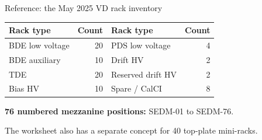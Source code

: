 \begin{frame}{Reference: the May 2025 VD rack inventory}
  \renewcommand{\arraystretch}{1.15}
  \begin{tabularx}{\textwidth}{@{}>{\RaggedRight\arraybackslash}Xr>{\RaggedRight\arraybackslash}Xr@{}}
    \toprule
    \textbf{Rack type} & \textbf{Count} & \textbf{Rack type} & \textbf{Count}\\
    \midrule
    BDE low voltage & 20 & PDS low voltage & 4\\
    BDE auxiliary & 10 & Drift HV & 2\\
    TDE & 20 & Reserved drift HV & 2\\
    Bias HV & 10 & Spare / CalCI & 8\\
    \bottomrule
  \end{tabularx}\par
  \bigskip
  \textbf{76 numbered mezzanine positions:} SEDM-01 to SEDM-76.\par
  \medskip
  The worksheet also has a separate concept for 40 top-plate mini-racks.
\end{frame}
